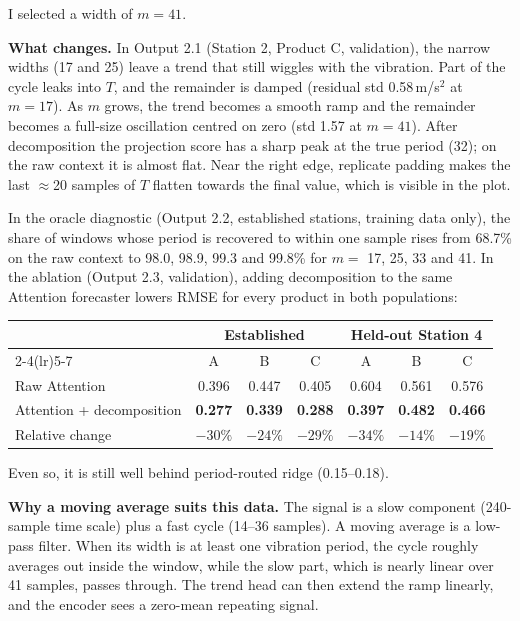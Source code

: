 \documentclass[11pt]{article}
\begin{document}
I selected a width of $m=41$.

\textbf{What changes.} In Output 2.1 (Station 2, Product C, validation), the narrow widths (17 and
25) leave a trend that still wiggles with the vibration. Part of the cycle leaks into $T$, and the
remainder is damped (residual std 0.58\,m/s$^2$ at $m=17$). As $m$ grows, the trend becomes a
smooth ramp and the remainder becomes a full-size oscillation centred on zero (std 1.57 at
$m=41$). After decomposition the projection score has a sharp peak at the true period (32); on the
raw context it is almost flat. Near the right edge, replicate padding makes the last $\approx$20
samples of $T$ flatten towards the final value, which is visible in the plot.

In the oracle diagnostic (Output 2.2, established stations, training data only), the share of
windows whose period is recovered to within one sample rises from 68.7\% on the raw context to
98.0, 98.9, 99.3 and 99.8\% for $m=$ 17, 25, 33 and 41. In the ablation (Output 2.3, validation),
adding decomposition to the same Attention forecaster lowers RMSE for every product in both
populations:
\begin{center}\small
\begin{tabular}{lcccccc}\toprule
 & \multicolumn{3}{c}{Established} & \multicolumn{3}{c}{Held-out Station 4}\\
 \cmidrule(lr){2-4}\cmidrule(lr){5-7}
 & A & B & C & A & B & C\\\midrule
 Raw Attention & 0.396 & 0.447 & 0.405 & 0.604 & 0.561 & 0.576\\
 Attention + decomposition & \textbf{0.277} & \textbf{0.339} & \textbf{0.288} & \textbf{0.397} & \textbf{0.482} & \textbf{0.466}\\
 Relative change & $-30\%$ & $-24\%$ & $-29\%$ & $-34\%$ & $-14\%$ & $-19\%$\\\bottomrule
\end{tabular}\end{center}
Even so, it is still well behind period-routed ridge (0.15--0.18).

\textbf{Why a moving average suits this data.} The signal is a slow component (240-sample time
scale) plus a fast cycle (14--36 samples). A moving average is a low-pass filter. When its width is
at least one vibration period, the cycle roughly averages out inside the window, while the slow
part, which is nearly linear over 41 samples, passes through. The trend head can then extend the
ramp linearly, and the encoder sees a zero-mean repeating signal.
\end{document}
